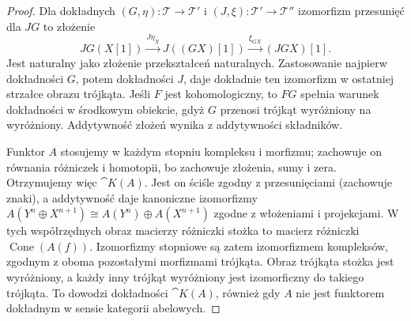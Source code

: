 \begin{proof}
Dla dokładnych $(G,\eta):\mathcal T\to\mathcal T'$ i $(J,\xi):\mathcal T'\to\mathcal T''$ izomorfizm przesunięć dla $JG$ to złożenie
\[
 JG(X[1])\xrightarrow{J\eta_X}J((GX)[1])
 \xrightarrow{\xi_{GX}}(JGX)[1].
\]
Jest naturalny jako złożenie przekształceń naturalnych. Zastosowanie najpierw dokładności $G$, potem dokładności $J$, daje dokładnie ten izomorfizm w ostatniej strzałce obrazu trójkąta. Jeśli $F$ jest kohomologiczny, to $FG$ spełnia warunek dokładności w środkowym obiekcie, gdyż $G$ przenosi trójkąt wyróżniony na wyróżniony. Addytywność złożeń wynika z addytywności składników.

Funktor $A$ stosujemy w każdym stopniu kompleksu i morfizmu; zachowuje on równania różniczek i homotopii, bo zachowuje złożenia, sumy i zera. Otrzymujemy więc $\cat K(A)$. Jest on ściśle zgodny z przesunięciami (zachowuje znaki), a addytywność daje kanoniczne izomorfizmy $A(Y^n\oplus X^{n+1})\cong A(Y^n)\oplus A(X^{n+1})$ zgodne z włożeniami i projekcjami. W tych współrzędnych obraz macierzy różniczki stożka to macierz różniczki $\operatorname{Cone}(A(f))$. Izomorfizmy stopniowe są zatem izomorfizmem kompleksów, zgodnym z oboma pozostałymi morfizmami trójkąta. Obraz trójkąta stożka jest wyróżniony, a każdy inny trójkąt wyróżniony jest izomorficzny do takiego trójkąta. To dowodzi dokładności $\cat K(A)$, również gdy $A$ nie jest funktorem dokładnym w sensie kategorii abelowych.
\end{proof}

